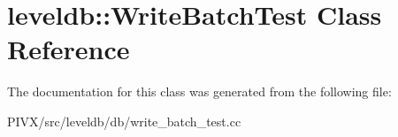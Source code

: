 \hypertarget{classleveldb_1_1_write_batch_test}{}\section{leveldb\+:\+:Write\+Batch\+Test Class Reference}
\label{classleveldb_1_1_write_batch_test}


The documentation for this class was generated from the following file\+:\begin{DoxyCompactItemize}
\item 
P\+I\+V\+X/src/leveldb/db/write\+\_\+batch\+\_\+test.\+cc\end{DoxyCompactItemize}
